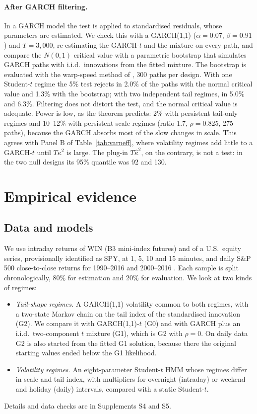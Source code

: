 \documentclass[12pt,letterpaper]{article}
\theoremstyle{plain}
\theoremstyle{remark}
\begin{document}
\paragraph{After GARCH filtering.} In a GARCH model the test is applied to standardised residuals, whose parameters are estimated. We check this with a GARCH(1,1) ($\alpha=0.07$, $\beta=0.91$) and $T=3{,}000$, re-estimating the GARCH-$t$ and the mixture on every path, and compare the $N(0,1)$ critical value with a parametric bootstrap that simulates GARCH paths with i.i.d.\ innovations from the fitted mixture. The bootstrap is evaluated with the warp-speed method of \citet{giacomini2013}, 300 paths per design. With one Student-$t$ regime the 5\% test rejects in 2.0\% of the paths with the normal critical value and 1.3\% with the bootstrap; with two independent tail regimes, in 5.0\% and 6.3\%. Filtering does not distort the test, and the normal critical value is adequate. Power is low, as the theorem predicts: 2\% with persistent tail-only regimes and 10--12\% with persistent scale regimes (ratio 1.7, $\rho=0.825$, 275 paths), because the GARCH absorbs most of the slow changes in scale. This agrees with Panel B of Table~\ref{tab:varneff}, where volatility regimes add little to a GARCH-$t$ until $T\kappa^2$ is large. The plug-in $T\hat\kappa^2$, on the contrary, is not a test: in the two null designs its 95\% quantile was 92 and 130.

\section{Empirical evidence}\label{sec:fc}

\subsection{Data and models}
We use intraday returns of WIN (B3 mini-index futures) and of a U.S.\ equity series, provisionally identified as SPY, at 1, 5, 10 and 15 minutes, and daily S\&P 500 close-to-close returns for 1990--2016 and 2000--2016 \citep{pretis2018}. Each sample is split chronologically, 80\% for estimation and 20\% for evaluation. We look at two kinds of regimes:
\begin{itemize}
\item \emph{Tail-shape regimes.} A GARCH(1,1) volatility common to both regimes, with a two-state Markov chain on the tail index of the standardised innovation (G2). We compare it with GARCH(1,1)-$t$ (G0) and with GARCH plus an i.i.d.\ two-component $t$ mixture (G1), which is G2 with $\rho=0$. On daily data G2 is also started from the fitted G1 solution, because there the original starting values ended below the G1 likelihood.
\item \emph{Volatility regimes.} An eight-parameter Student-$t$ HMM whose regimes differ in scale and tail index, with multipliers for overnight (intraday) or weekend and holiday (daily) intervals, compared with a static Student-$t$.
\end{itemize}
Details and data checks are in Supplements S4 and S5.
\end{document}
